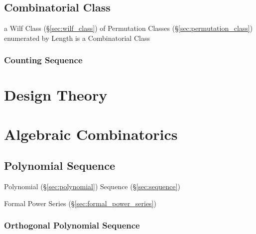 \subsection{Combinatorial Class}\label{sec:combinatorial_class}

a Wilf Class (\S\ref{sec:wilf_class}) of Permutation Classes
(\S\ref{sec:permutation_class}) enumerated by Length is a Combinatorial Class



\subsubsection{Counting Sequence}\label{sec:counting_sequence}



\section{Design Theory}\label{sec:combinatorial_design}

\section{Algebraic Combinatorics}\label{sec:algebraic_combinatorics}

\subsection{Polynomial Sequence}\label{sec:polynomial_sequence}

Polynomial (\S\ref{sec:polynomial}) Sequence (\S\ref{sec:sequence})

\fist Formal Power Series (\S\ref{sec:formal_power_series})



\subsubsection{Orthogonal Polynomial Sequence}
\label{sec:orthogonal_polynomial_sequence}

